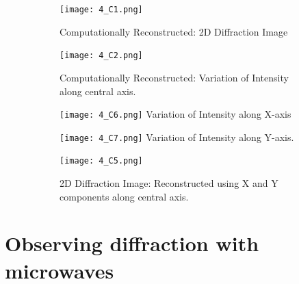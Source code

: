 \documentclass[12pt]{report}
\begin{document}
\begin{figure}[h!]
	\centering
	\begin{subfigure}{0.45\textwidth}
		\texttt{[image: 4\_C1.png]}
		\begin{center} 
			Computationally Reconstructed: 2D Diffraction Image
		\end{center}
	\end{subfigure}
	\begin{subfigure}{0.45\textwidth}
		\texttt{[image: 4\_C2.png]}
		\begin{center}
			Computationally Reconstructed: Variation of Intensity along central axis.
		\end{center}
	\end{subfigure}
	\begin{subfigure}{0.45\textwidth}
		\texttt{[image: 4\_C6.png]}
		Variation of Intensity along X-axis
	\end{subfigure}
	\begin{subfigure}{0.45\textwidth}
		\texttt{[image: 4\_C7.png]}
		Variation of Intensity along Y-axis.
	\end{subfigure}
	\begin{subfigure}{0.5\textwidth}
		\texttt{[image: 4\_C5.png]}
		\begin{center} 
			2D Diffraction Image: Reconstructed using X and Y components along central axis. 
		\end{center}
	\end{subfigure}
\end{figure}


\newpage
\section{Observing diffraction with microwaves}

\newpage
\end{document}
